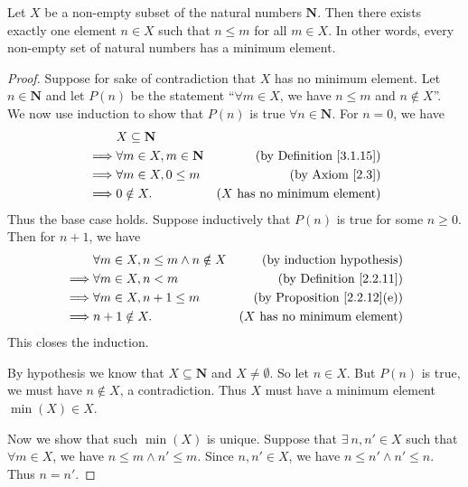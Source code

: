 \begin{proposition}\label{8.1.4}
    Let \(X\) be a non-empty subset of the natural numbers \(\mathbf{N}\).
    Then there exists exactly one element \(n \in X\) such that \(n \leq m\) for all \(m \in X\).
    In other words, every non-empty set of natural numbers has a minimum element.
\end{proposition}

\begin{proof}
    Suppose for sake of contradiction that \(X\) has no minimum element.
    Let \(n \in \mathbf{N}\) and let \(P(n)\) be the statement ``\(\forall m \in X\), we have \(n \leq m\) and \(n \notin X\)''.
    We now use induction to show that \(P(n)\) is true \(\forall n \in \mathbf{N}\).
    For \(n = 0\), we have
    \begin{align*}
                 & X \subseteq \mathbf{N}                                                    \\
        \implies & \forall m \in X, m \in \mathbf{N} & \text{(by Definition \ref{3.1.15})}   \\
        \implies & \forall m \in X, 0 \leq m         & \text{(by Axiom \ref{2.3})}           \\
        \implies & 0 \notin X.                       & \text{(\(X\) has no minimum element)}
    \end{align*}
    Thus the base case holds.
    Suppose inductively that \(P(n)\) is true for some \(n \geq 0\).
    Then for \(n + 1\), we have
    \begin{align*}
                 & \forall m \in X, n \leq m \land n \notin X & \text{(by induction hypothesis)}        \\
        \implies & \forall m \in X, n < m                     & \text{(by Definition \ref{2.2.11})}     \\
        \implies & \forall m \in X, n + 1 \leq m              & \text{(by Proposition \ref{2.2.12}(e))} \\
        \implies & n + 1 \notin X.                            & \text{(\(X\) has no minimum element)}
    \end{align*}
    This closes the induction.

    By hypothesis we know that \(X \subseteq \mathbf{N}\) and \(X \neq \emptyset\).
    So let \(n \in X\).
    But \(P(n)\) is true, we must have \(n \notin X\), a contradiction.
    Thus \(X\) must have a minimum element \(\min(X) \in X\).

    Now we show that such \(\min(X)\) is unique.
    Suppose that \(\exists\ n, n' \in X\) such that \(\forall m \in X\), we have \(n \leq m \land n' \leq m\).
    Since \(n, n' \in X\), we have \(n \leq n' \land n' \leq n\).
    Thus \(n = n'\).
\end{proof}

